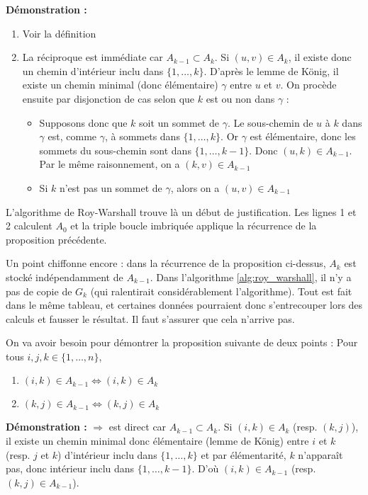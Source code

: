 \documentclass[../../../main.tex]{subfiles}
\begin{document}
\textbf{Démonstration :}
\begin{enumerate}
	\item Voir la définition
	\item La réciproque est immédiate car $A_{k-1}\subset A_k$. Si $(u, v)\in A_k$, il existe donc un chemin d'intérieur inclu dans $\{1, \dots, k\}$. D'après le lemme de König, il existe un chemin minimal (donc élémentaire) $\gamma$ entre $u$ et $v$. \newline
	On procède ensuite par disjonction de cas selon que $k$ est ou non dans $\gamma$ :
	\begin{itemize}
		\item Supposons donc que $k$ soit un sommet de $\gamma$. Le sous-chemin de $u$ à $k$ dans $\gamma$ est, comme $\gamma$, à sommets dans $\{1, \dots, k\}$. Or $\gamma$ est élémentaire, donc les sommets du sous-chemin sont dans $\{1, \dots, k-1\}$. Donc $(u, k)\in A_{k-1}$. Par le même raisonnement, on a $(k, v)\in A_{k-1}$
		\item Si $k$ n'est pas un sommet de $\gamma$, alors on a $(u, v)\in A_{k-1}$
	\end{itemize}
\end{enumerate}
L'algorithme de Roy-Warshall trouve là un début de justification. Les lignes 1 et 2 calculent $A_0$ et la triple boucle imbriquée applique la récurrence de la proposition précédente.

Un point chiffonne encore : dans la récurrence de la proposition ci-dessus, $A_k$ est stocké indépendamment de $A_{k-1}$. Dans l'algorithme \ref{alg:roy_warshall}, il n'y a pas de copie de $G_k$ (qui ralentirait considérablement l'algorithme). Tout est fait dans le même tableau, et certaines données pourraient donc s'entrecouper lors des calculs et fausser le résultat. Il faut s'assurer que cela n'arrive pas.

\lemma{} On va avoir besoin pour démontrer la proposition suivante de deux points :\newline
Pour tous $i, j, k\in\{1, \dots, n\}$,
\begin{enumerate}
	\item $(i, k)\in A_{k-1}\Leftrightarrow (i, k)\in A_k$
	\item $(k, j)\in A_{k-1}\Leftrightarrow (k, j)\in A_k$
\end{enumerate}
\textbf{Démonstration :} $\Rightarrow$ est direct car $A_{k-1}\subset A_k$. Si $(i, k)\in A_k$ (resp. $(k, j)$), il existe un chemin minimal donc élémentaire (lemme de König) entre $i$ et $k$ (resp. $j$ et $k$) d'intérieur inclu dans $\{1, \dots, k\}$ et par élémentarité, $k$ n'apparaît pas, donc intérieur inclu dans $\{1, \dots, k-1\}$. D'où $(i, k)\in A_{k-1}$ (resp. $(k, j)\in A_{k-1}$).
\end{document}
